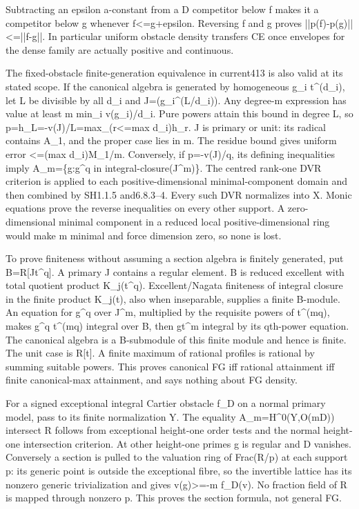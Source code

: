 Subtracting an epsilon a-constant from a D competitor below f makes it a competitor below g whenever f<=g+epsilon. Reversing f and g proves ||p(f)-p(g)||<=||f-g||. In particular uniform obstacle density transfers CE once envelopes for the dense family are actually positive and continuous.

The fixed-obstacle finite-generation equivalence in current413 is also valid at its stated scope. If the canonical algebra is generated by homogeneous g\_i t\textasciicircum{}(d\_i), let L be divisible by all d\_i and J=(g\_i\textasciicircum{}(L/d\_i)). Any degree-m expression has value at least m min\_i v(g\_i)/d\_i. Pure powers attain this bound in degree L, so p=h\_L=-v(J)/L=max\_(r<=max d\_i)h\_r. J is primary or unit: its radical contains A\_1, and the proper case lies in m. The residue bound gives uniform error <=(max d\_i)M\_1/m. Conversely, if p=-v(J)/q, its defining inequalities imply A\_m=\{g:g\textasciicircum{}q in integral-closure(J\textasciicircum{}m)\}. The centred rank-one DVR criterion is applied to each positive-dimensional minimal-component domain and then combined by SH1.1.5 and6.8.3--4. Every such DVR normalizes into X. Monic equations prove the reverse inequalities on every other support. A zero-dimensional minimal component in a reduced local positive-dimensional ring would make m minimal and force dimension zero, so none is lost.

To prove finiteness without assuming a section algebra is finitely generated, put B=R[Jt\textasciicircum{}q]. A primary J contains a regular element. B is reduced excellent with total quotient product K\_j(t\textasciicircum{}q). Excellent/Nagata finiteness of integral closure in the finite product K\_j(t), also when inseparable, supplies a finite B-module. An equation for g\textasciicircum{}q over J\textasciicircum{}m, multiplied by the requisite powers of t\textasciicircum{}(mq), makes g\textasciicircum{}q t\textasciicircum{}(mq) integral over B, then gt\textasciicircum{}m integral by its qth-power equation. The canonical algebra is a B-submodule of this finite module and hence is finite. The unit case is R[t]. A finite maximum of rational profiles is rational by summing suitable powers. This proves canonical FG iff rational attainment iff finite canonical-max attainment, and says nothing about FG density.

For a signed exceptional integral Cartier obstacle f\_D on a normal primary model, pass to its finite normalization Y. The equality A\_m=H\textasciicircum{}0(Y,O(mD)) intersect R follows from exceptional height-one order tests and the normal height-one intersection criterion. At other height-one primes g is regular and D vanishes. Conversely a section is pulled to the valuation ring of Frac(R/p) at each support p: its generic point is outside the exceptional fibre, so the invertible lattice has its nonzero generic trivialization and gives v(g)>=-m f\_D(v). No fraction field of R is mapped through nonzero p. This proves the section formula, not general FG.

